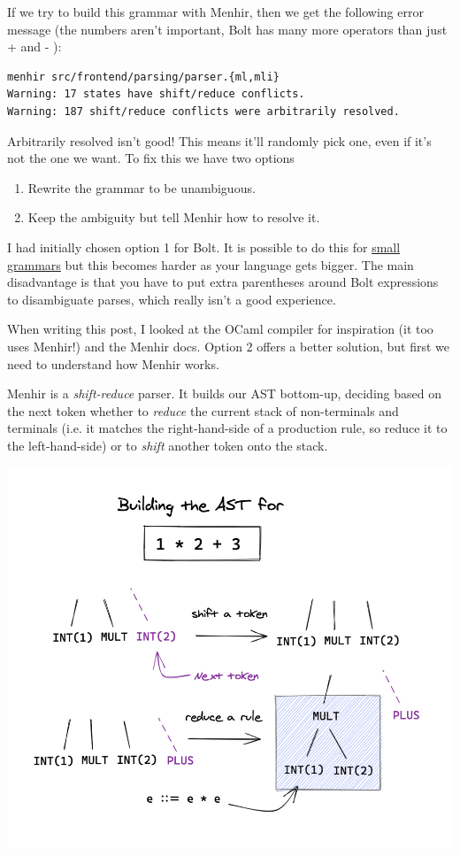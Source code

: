 If we try to build this grammar with Menhir, then we get the following
error message (the numbers aren't important, Bolt has many more
operators than just + and - ):


\begin{verbatim}
menhir src/frontend/parsing/parser.{ml,mli}
Warning: 17 states have shift/reduce conflicts.
Warning: 187 shift/reduce conflicts were arbitrarily resolved.
\end{verbatim}

Arbitrarily resolved isn't good! This means it'll randomly pick one,
even if it's not the one we want. To fix this we have two options

\begin{enumerate}
\tightlist
\item
  Rewrite the grammar to be unambiguous.
\item
  Keep the ambiguity but tell Menhir how to resolve it.
\end{enumerate}

I had initially chosen option 1 for Bolt. It is possible to do this for
\href{https://stackoverflow.com/a/3106287/6752788}{small grammars} but
this becomes harder as your language gets bigger. The main disadvantage
is that you have to put extra parentheses around Bolt expressions to
disambiguate parses, which really isn't a good experience.

When writing this post, I looked at the OCaml compiler for inspiration
(it too uses Menhir!) and the Menhir docs. Option 2 offers a better
solution, but first we need to understand how Menhir works.

Menhir is a \emph{shift-reduce} parser. It builds our AST bottom-up,
deciding based on the next token whether to \emph{reduce} the current
stack of non-terminals and terminals (i.e. it matches the
right-hand-side of a production rule, so reduce it to the
left-hand-side) or to \emph{shift} another token onto the stack.

{
\href{https://mukulrathi.com/static/e2c460bd0a6bcc3f1ab33fc4f962c906/2215f/shift-reduce-parser.png}{{}
\includegraphics[width=\linewidth]{03_files/shift-reduce-parser.png}} }

